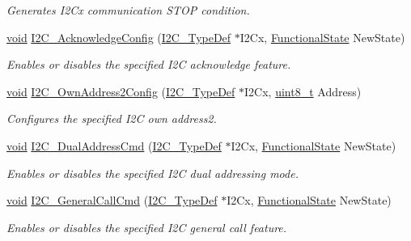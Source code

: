 \begin{DoxyCompactItemize}
\begin{DoxyCompactList}\small\item\em Generates I2\+Cx communication S\+T\+OP condition. \end{DoxyCompactList}\item 
\hyperlink{usb__devapi_8h_afabf60e7f57651d6d595a02c75f07cd0}{void} \hyperlink{group___i2_c___exported___functions_ga7bb44e894d68a7991f564c43fb187486}{I2\+C\+\_\+\+Acknowledge\+Config} (\hyperlink{struct_i2_c___type_def}{I2\+C\+\_\+\+Type\+Def} $\ast$I2\+Cx, \hyperlink{agilefox_2library_2inc_2stm32f10x__type_8h_ac9a7e9a35d2513ec15c3b537aaa4fba1}{Functional\+State} New\+State)
\begin{DoxyCompactList}\small\item\em Enables or disables the specified I2C acknowledge feature. \end{DoxyCompactList}\item 
\hyperlink{usb__devapi_8h_afabf60e7f57651d6d595a02c75f07cd0}{void} \hyperlink{group___i2_c___exported___functions_ga7be2cc634a613c8e3539137e897a22df}{I2\+C\+\_\+\+Own\+Address2\+Config} (\hyperlink{struct_i2_c___type_def}{I2\+C\+\_\+\+Type\+Def} $\ast$I2\+Cx, \hyperlink{_p_e___types_8h_aba7bc1797add20fe3efdf37ced1182c5}{uint8\+\_\+t} Address)
\begin{DoxyCompactList}\small\item\em Configures the specified I2C own address2. \end{DoxyCompactList}\item 
\hyperlink{usb__devapi_8h_afabf60e7f57651d6d595a02c75f07cd0}{void} \hyperlink{group___i2_c___exported___functions_ga02145a333a56e79557d6ef4ea03fc313}{I2\+C\+\_\+\+Dual\+Address\+Cmd} (\hyperlink{struct_i2_c___type_def}{I2\+C\+\_\+\+Type\+Def} $\ast$I2\+Cx, \hyperlink{agilefox_2library_2inc_2stm32f10x__type_8h_ac9a7e9a35d2513ec15c3b537aaa4fba1}{Functional\+State} New\+State)
\begin{DoxyCompactList}\small\item\em Enables or disables the specified I2C dual addressing mode. \end{DoxyCompactList}\item 
\hyperlink{usb__devapi_8h_afabf60e7f57651d6d595a02c75f07cd0}{void} \hyperlink{group___i2_c___exported___functions_ga65c740fc8d7b3b9f15cc432d8699d471}{I2\+C\+\_\+\+General\+Call\+Cmd} (\hyperlink{struct_i2_c___type_def}{I2\+C\+\_\+\+Type\+Def} $\ast$I2\+Cx, \hyperlink{agilefox_2library_2inc_2stm32f10x__type_8h_ac9a7e9a35d2513ec15c3b537aaa4fba1}{Functional\+State} New\+State)
\begin{DoxyCompactList}\small\item\em Enables or disables the specified I2C general call feature. \end{DoxyCompactList}\item 

\end{DoxyCompactItemize}
